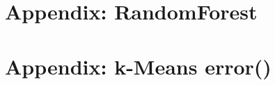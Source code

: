 \documentclass{article}
\begin{document}
\section{Appendix: RandomForest}
\label{appendix:RandomForest}
\begin{center}
    
\end{center}

\section{Appendix: k-Means error()}
\label{appendix:k-Means}
\begin{center}
    
\end{center}
\end{document}

